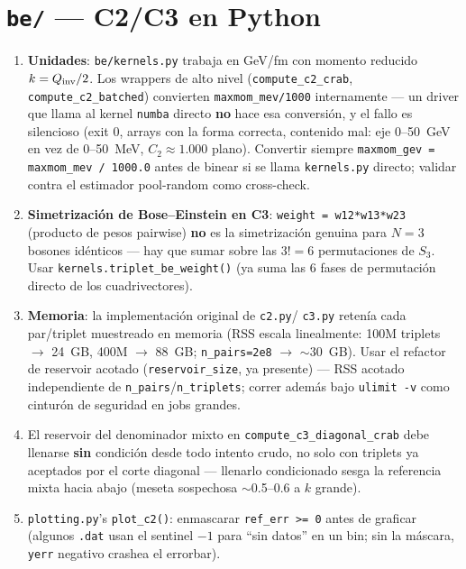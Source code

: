 \documentclass[11pt]{article}
\begin{document}
\section{\texttt{be/} --- C2/C3 en Python}

\begin{enumerate}[leftmargin=*]
  \item \textbf{Unidades}: \texttt{be/kernels.py} trabaja en GeV/fm con
  momento reducido $k=Q_{\rm inv}/2$. Los wrappers de alto nivel
  (\texttt{compute\_c2\_crab}, \texttt{compute\_c2\_batched}) convierten
  \texttt{maxmom\_mev/1000} internamente --- un driver que llama al kernel
  \texttt{numba} directo \textbf{no} hace esa conversión, y el fallo es
  silencioso (exit 0, arrays con la forma correcta, contenido mal: eje
  0--50~GeV en vez de 0--50~MeV, $C_2\approx1.000$ plano). Convertir
  siempre \texttt{maxmom\_gev = maxmom\_mev / 1000.0} antes de binear si se
  llama \texttt{kernels.py} directo; validar contra el estimador
  pool-random como cross-check.
  \item \textbf{Simetrización de Bose--Einstein en C3}: \texttt{weight =
  w12*w13*w23} (producto de pesos pairwise) \textbf{no} es la
  simetrización genuina para $N=3$ bosones idénticos --- hay que sumar
  sobre las $3!=6$ permutaciones de $S_3$. Usar
  \texttt{kernels.triplet\_be\_weight()} (ya suma las 6 fases de
  permutación directo de los cuadrivectores).
  \item \textbf{Memoria}: la implementación original de \texttt{c2.py}/
  \texttt{c3.py} retenía cada par/triplet muestreado en memoria (RSS
  escala linealmente: 100M triplets $\to$ 24~GB, 400M $\to$ 88~GB;
  \texttt{n\_pairs=2e8} $\to$ $\sim$30~GB). Usar el refactor de reservoir
  acotado (\texttt{reservoir\_size}, ya presente) --- RSS acotado
  independiente de \texttt{n\_pairs}/\texttt{n\_triplets}; correr además
  bajo \texttt{ulimit -v} como cinturón de seguridad en jobs grandes.
  \item El reservoir del denominador mixto en
  \texttt{compute\_c3\_diagonal\_crab} debe llenarse \textbf{sin}
  condición desde todo intento crudo, no solo con triplets ya aceptados
  por el corte diagonal --- llenarlo condicionado sesga la referencia
  mixta hacia abajo (meseta sospechosa $\sim$0.5--0.6 a $k$ grande).
  \item \texttt{plotting.py}'s \texttt{plot\_c2()}: enmascarar
  \texttt{ref\_err >= 0} antes de graficar (algunos \texttt{.dat} usan el
  sentinel $-1$ para ``sin datos'' en un bin; sin la máscara,
  \texttt{yerr} negativo crashea el errorbar).
\end{enumerate}
\end{document}
